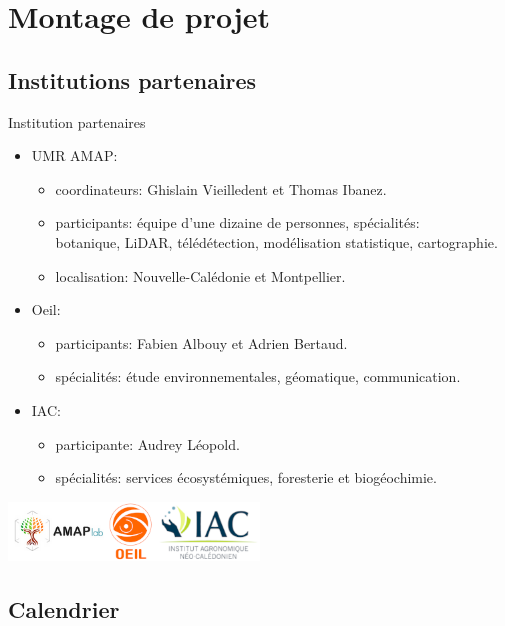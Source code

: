 \documentclass[10pt,table,dvipsnames,compress]{beamer}
\begin{document}
\section{Montage de projet}
\label{sec:orgc341204}

\subsection{Institutions partenaires}
\label{sec:org6309663}

\begin{frame}[label={sec:org91e719f}]{Institution partenaires}
\begin{itemize}
\item UMR AMAP:
\begin{itemize}
\item coordinateurs: Ghislain Vieilledent et Thomas Ibanez.
\item participants: équipe d'une dizaine de personnes, spécialités: \\
botanique, LiDAR, télédétection, modélisation statistique, cartographie.
\item localisation: Nouvelle-Calédonie et Montpellier.
\end{itemize}
\item Oeil:
\begin{itemize}
\item participants: Fabien Albouy et Adrien Bertaud.
\item spécialités: étude environnementales, géomatique, communication.
\end{itemize}
\item IAC:
\begin{itemize}
\item participante: Audrey Léopold.
\item spécialités: services écosystémiques, foresterie et biogéochimie.
\end{itemize}
\end{itemize}

\begin{center}
\includegraphics[width=0.5\textwidth]{figs/partners_logos.png}
\end{center}
\end{frame}

\subsection{Calendrier}
\label{sec:org2b2b366}
\end{document}

